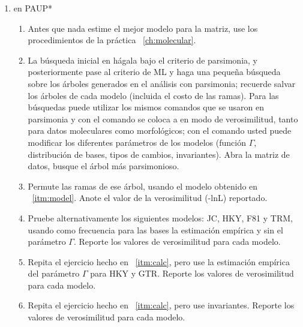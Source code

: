 \begin{enumerate} 
 \item{en PAUP*}
	\begin{enumerate} 
		\item \label{itm:model} Antes que nada estime el mejor modelo 
		para la matriz, use los procedimientos de la pr\'actica 
		~\ref{ch:molecular}. 

		
		\item \label{itm:calc} La b\'usqueda inicial en  h\'agala bajo
      el criterio de parsimonia, y posteriormente pase al criterio de ML y haga
      una \textrm{peque\~na} b\'usqueda sobre los \'arboles generados en el
      an\'alisis con parsimonia; recuerde salvar los \'arboles de cada modelo
      (incluida el costo de las ramas). Para las b\'usquedas puede utilizar los
      mismos comandos que se usaron en parsimonia y con el comando  se coloca a  en modo de
      verosimilitud, tanto para datos moleculares como morfol\'ogicos; con el comando  usted puede modificar los diferentes par\'ametros de los modelos (funci\'on $\Gamma$, distribuci\'on de bases, tipos de cambios, invariantes). Abra la matriz de datos, busque el \'arbol m\'as parsimonioso.
		\item Permute las ramas de ese \'arbol, usando el modelo obtenido en ~\ref{itm:model}. Anote el valor de la verosimilitud (-lnL) reportado.
		\item  Pruebe alternativamente los siguientes modelos: JC, HKY, F81 y TRM, usando como frecuencia para las bases la estimaci\'on emp\'irica y sin el par\'ametro $\Gamma$. Reporte los valores de verosimilitud para cada modelo.


		\item Repita el ejercicio hecho en ~\ref{itm:calc}, pero use la estimaci\'on emp\'irica del par\'ametro $\Gamma$ para HKY y GTR. Reporte los valores de verosimilitud para cada modelo.
		
		\item Repita el ejercicio hecho en ~\ref{itm:calc}, pero use invariantes. Reporte los valores de verosimilitud para cada modelo.
	\end{enumerate}


\end{enumerate}
